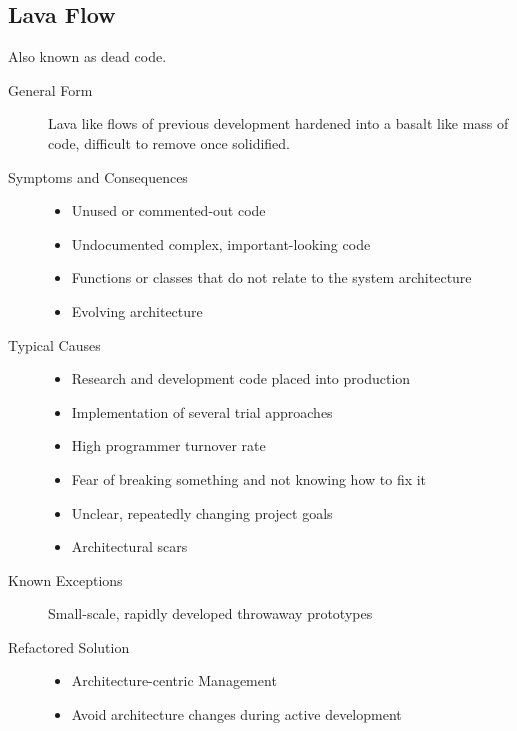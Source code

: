 \subsection{Lava Flow}
Also known as dead code.
\begin{description}
  \item[General Form] Lava like flows of previous development hardened into a basalt like mass of code, difficult to remove once solidified.
  \item[Symptoms and Consequences]
  \begin{itemize}
    \item Unused or commented-out code
    \item Undocumented complex, important-looking code
    \item Functions or classes that do not relate to the system architecture
    \item Evolving architecture
  \end{itemize}
  \item[Typical Causes]
  \begin{itemize}
    \item Research and development code placed into production
    \item Implementation of several trial approaches
    \item High programmer turnover rate
    \item Fear of breaking something and not knowing how to fix it
    \item Unclear, repeatedly changing project goals
    \item Architectural scars
  \end{itemize}
  \item[Known Exceptions] Small-scale, rapidly developed throwaway prototypes
  \item[Refactored Solution]
  \begin{itemize}
  	\item Architecture-centric Management
  	\item Avoid architecture changes during active development
  \end{itemize}
\end{description}
\newpage

